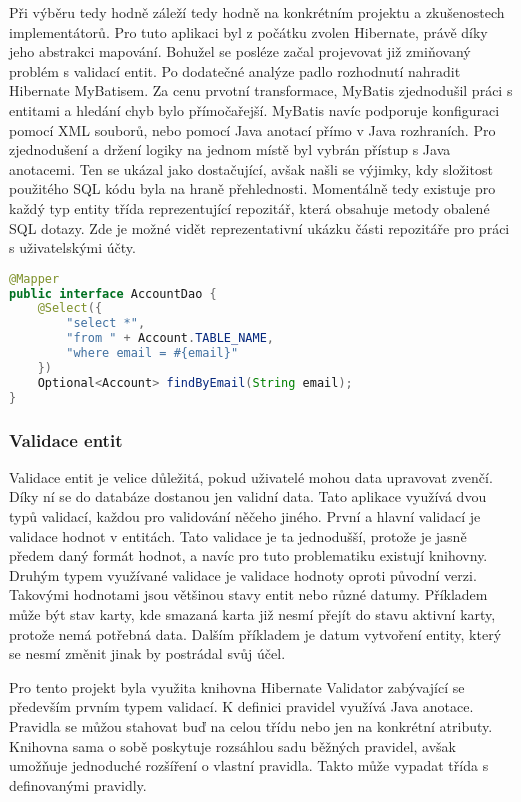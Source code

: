 		Při výběru tedy hodně záleží tedy hodně na konkrétním projektu a zkušenostech implementátorů.
		Pro tuto aplikaci byl z počátku zvolen Hibernate, právě díky jeho abstrakci mapování.
		Bohužel se posléze začal projevovat již zmiňovaný problém s validací entit.
		Po dodatečné analýze padlo rozhodnutí nahradit Hibernate MyBatisem.
		Za cenu prvotní transformace, MyBatis zjednodušil práci s entitami a hledání chyb bylo přímočařejší.
		MyBatis navíc podporuje konfiguraci pomocí \ac{XML} souborů, nebo pomocí Java anotací přímo v Java rozhraních.
		Pro zjednodušení a držení logiky na jednom místě byl vybrán přístup s Java anotacemi.
		Ten se ukázal jako dostačující, avšak našli se výjimky, kdy složitost použitého \ac{SQL} kódu
		byla na hraně přehlednosti.
		Momentálně tedy existuje pro každý typ entity třída reprezentující repozitář, která obsahuje metody obalené \ac{SQL}
		dotazy.
		Zde je možné vidět reprezentativní ukázku části repozitáře pro práci s uživatelskými účty.

		\begin{lstlisting}[language=Java,caption={Ukázka získání uživatelského účtu z databáze MyBatisem. Zdroj: [autor]}]
@Mapper
public interface AccountDao {
	@Select({
		"select *",
		"from " + Account.TABLE_NAME,
		"where email = #{email}"
	})
	Optional<Account> findByEmail(String email);
}
		\end{lstlisting}

		\subsubsection{Validace entit}

		Validace entit je velice důležitá, pokud uživatelé mohou data upravovat zvenčí.
		Díky ní se do databáze dostanou jen validní data.
		Tato aplikace využívá dvou typů validací, každou pro validování něčeho jiného.
		První a hlavní validací je validace hodnot v entitách.
		Tato validace je ta jednodušší, protože je jasně předem daný formát hodnot, a navíc pro tuto problematiku existují knihovny.
		Druhým typem využívané validace je validace hodnoty oproti původní verzi.
		Takovými hodnotami jsou většinou stavy entit nebo různé datumy.
		Příkladem může být stav karty, kde smazaná karta již nesmí přejít do stavu aktivní karty, protože nemá potřebná data.
		Dalším příkladem je datum vytvoření entity, který se nesmí změnit jinak by postrádal svůj účel.

		Pro tento projekt byla využita knihovna Hibernate Validator zabývající se především prvním typem validací.
		K definici pravidel využívá Java anotace.
		Pravidla se můžou stahovat buď na celou třídu nebo jen na konkrétní atributy.
		Knihovna sama o sobě poskytuje rozsáhlou sadu běžných pravidel, avšak umožňuje jednoduché rozšíření o vlastní
		pravidla.
		Takto může vypadat třída s definovanými pravidly.

